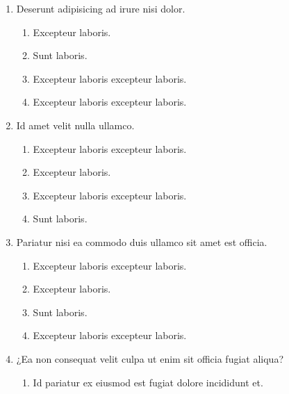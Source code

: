 \documentclass[a4paper,12pt]{article}
\begin{document}
\begin{enumerate}[label=\textbf{\arabic*.}]
\item Deserunt adipisicing ad irure nisi dolor.
\begin{multicols}{2}
	\begin{enumerate}
		\item  Excepteur laboris.
    
		\item  Sunt laboris.
    
		\item  Excepteur laboris excepteur laboris.
  
		\item  Excepteur laboris excepteur laboris.
    
	\end{enumerate}

\end{multicols}
\item Id amet velit nulla ullamco.
\begin{multicols}{2}
	\begin{enumerate}
		\item  Excepteur laboris excepteur laboris.
  
		\item  Excepteur laboris.
    
		\item  Excepteur laboris excepteur laboris.
    
		\item  Sunt laboris.
    
	\end{enumerate}

\end{multicols}
\item Pariatur nisi ea commodo duis ullamco sit amet est officia.
\begin{multicols}{2}
	\begin{enumerate}
		\item  Excepteur laboris excepteur laboris.
  
		\item  Excepteur laboris.
    
		\item  Sunt laboris.
    
		\item  Excepteur laboris excepteur laboris.
    
	\end{enumerate}

\end{multicols}
\item ¿Ea non consequat velit culpa ut enim sit officia fugiat aliqua?
\begin{multicols}{2}
	\begin{enumerate}
		\item  Id pariatur ex eiusmod est fugiat dolore incididunt et.
    

\end{enumerate}
\end{multicols}
\end{enumerate}
\end{document}
